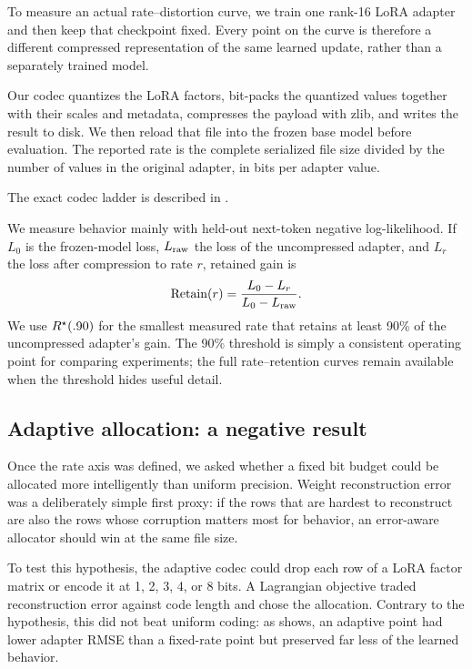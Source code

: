 To measure an actual rate--distortion curve, we train one rank-16 LoRA adapter and then keep that checkpoint fixed. Every point on the curve is therefore a different compressed representation of the same learned update, rather than a separately trained model.

Our codec quantizes the LoRA factors, bit-packs the quantized values together with their scales and metadata, compresses the payload with zlib, and writes the result to disk. We then reload that file into the frozen base model before evaluation. The reported rate is the complete serialized file size divided by the number of values in the original adapter, in bits per adapter value.

The exact codec ladder is described in .

We measure behavior mainly with held-out next-token negative log-likelihood. If $L_0$ is the frozen-model loss, $L_{\rm raw}$ the loss of the uncompressed adapter, and $L_r$ the loss after compression to rate $r$, retained gain is
\[
\operatorname{Retain}(r)=\frac{L_0-L_r}{L_0-L_{\rm raw}}.
\]
We use $R^{\star}(.90)$ for the smallest measured rate that retains at least 90\% of the uncompressed adapter's gain. The 90\% threshold is simply a consistent operating point for comparing experiments; the full rate--retention curves remain available when the threshold hides useful detail.

\subsection{Adaptive allocation: a negative result}
\label{subsec:adaptive-allocation}

Once the rate axis was defined, we asked whether a fixed bit budget could be allocated more intelligently than uniform precision. Weight reconstruction error was a deliberately simple first proxy: if the rows that are hardest to reconstruct are also the rows whose corruption matters most for behavior, an error-aware allocator should win at the same file size.

To test this hypothesis, the adaptive codec could drop each row of a LoRA factor matrix or encode it at 1, 2, 3, 4, or 8 bits. A Lagrangian objective traded reconstruction error against code length and chose the allocation. Contrary to the hypothesis, this did not beat uniform coding: as  shows, an adaptive point had lower adapter RMSE than a fixed-rate point but preserved far less of the learned behavior.

